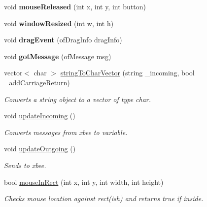 \begin{DoxyCompactItemize}
\item 
\hypertarget{classtest_app_aa3680ffc782b1e5c451289817f20c9c6}{
void {\bfseries mouseReleased} (int x, int y, int button)}
\label{classtest_app_aa3680ffc782b1e5c451289817f20c9c6}

\item 
\hypertarget{classtest_app_a428b7df9c64352d6e7cb234fc297e6c9}{
void {\bfseries windowResized} (int w, int h)}
\label{classtest_app_a428b7df9c64352d6e7cb234fc297e6c9}

\item 
\hypertarget{classtest_app_af15e9e9064fe5ccbe6c82cc401ae9e09}{
void {\bfseries dragEvent} (ofDragInfo dragInfo)}
\label{classtest_app_af15e9e9064fe5ccbe6c82cc401ae9e09}

\item 
\hypertarget{classtest_app_a66dbc8c5c2d4e20febebe9fd42b8c851}{
void {\bfseries gotMessage} (ofMessage msg)}
\label{classtest_app_a66dbc8c5c2d4e20febebe9fd42b8c851}

\item 
\hypertarget{classtest_app_a3faac502b02b61d213ac09353caf096d}{
vector$<$ char $>$ \hyperlink{classtest_app_a3faac502b02b61d213ac09353caf096d}{stringToCharVector} (string \_\-incoming, bool \_\-addCarriageReturn)}
\label{classtest_app_a3faac502b02b61d213ac09353caf096d}

\begin{DoxyCompactList}\small\item\em Converts a string object to a vector of type char. \end{DoxyCompactList}\item 
\hypertarget{classtest_app_ab5f01f9976337fe054bc8f57bb9d17c3}{
void \hyperlink{classtest_app_ab5f01f9976337fe054bc8f57bb9d17c3}{updateIncoming} ()}
\label{classtest_app_ab5f01f9976337fe054bc8f57bb9d17c3}

\begin{DoxyCompactList}\small\item\em Converts messages from xbee to  variable. \end{DoxyCompactList}\item 
\hypertarget{classtest_app_ac73b67e15f6823363c0840e591c11935}{
void \hyperlink{classtest_app_ac73b67e15f6823363c0840e591c11935}{updateOutgoing} ()}
\label{classtest_app_ac73b67e15f6823363c0840e591c11935}

\begin{DoxyCompactList}\small\item\em Sends  to xbee. \end{DoxyCompactList}\item 
\hypertarget{classtest_app_a0cd8ec655fbb6e4d89ad57554c80f75a}{
bool \hyperlink{classtest_app_a0cd8ec655fbb6e4d89ad57554c80f75a}{mouseInRect} (int x, int y, int width, int height)}
\label{classtest_app_a0cd8ec655fbb6e4d89ad57554c80f75a}

\begin{DoxyCompactList}\small\item\em Checks mouse location against rect(ish) and returns true if inside. \end{DoxyCompactList}\end{DoxyCompactItemize}
